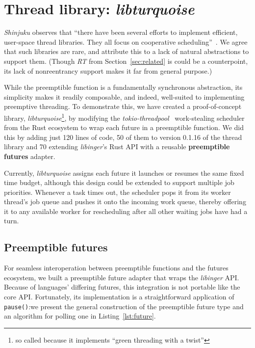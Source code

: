 \section{Thread library: \textit{libturquoise}}
\label{sec:libturquoise}

\textit{Shinjuku} observes that ``there have been several efforts to implement
efficient, user-space thread libraries.  They all focus on cooperative
scheduling''~\cite{Kaffes:nsdi2019}.  We agree that such libraries are rare, and
attribute this to a lack of natural abstractions to support them.  (Though
\textit{RT} from Section~\ref{sec:related} is could be a counterpoint, its lack of
nonreentrancy support makes it far from general purpose.)

While the preemptible function is a fundamentally synchronous abstraction, its
simplicity makes it readily composable, and indeed, well-suited to implementing
preemptive threading.  To demonstrate this, we have created a
proof-of-concept library, \textit{libturquoise}\footnote{so called because it
implements ``green threading with a twist''}, by modifying the
\textit{tokio-threadpool}~\cite{www-tokio-threadpool} work-stealing scheduler from
the Rust ecosystem to wrap each future in a preemptible function.  We did this by
adding just 120 lines of code, 50 of them to version 0.1.16 of the thread library and
70 extending \textit{libinger}'s Rust API with a reusable \textbf{preemptible
futures} adapter.

Currently, \textit{libturquoise} assigns each future it launches or resumes the same
fixed time budget, although this design could be extended to support
multiple job priorities.  Whenever a task times out, the scheduler pops it from its
worker thread's job queue and pushes it onto the incoming work queue, thereby
offering it to any available worker for rescheduling after all other waiting jobs
have had a turn.


\subsection{Preemptible futures}

For seamless interoperation between preemptible functions and the futures ecosystem,
we built a preemptible future adapter that wraps the \textit{libinger} API.  Because
of languages' differing futures, this integration is not portable like the core API.
Fortunately, its implementation is a straightforward application of
\texttt{pause()}:\@ we present the general construction of the preemptible future
type and an algorithm for polling one in Listing~\ref{lst:future}.

